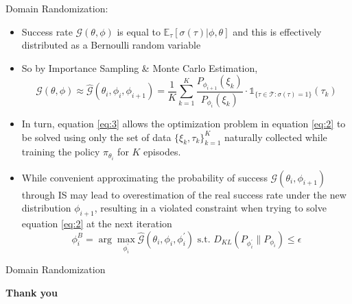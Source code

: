 \documentclass{beamer}
\newcommand{\mbb}[1]{\mathbb{#1}}
\newcommand{\mc}[1]{\mathcal{#1}}
\begin{document}
\begin{frame}{Domain Randomization: \cite{tiboniDomainRandomizationEntropy2024}}
    \begin{itemize}
        \item Success rate $\mc{G}(\theta, \phi)$ is equal to $\mbb{E}_{\tau} [\sigma(\tau) | \phi, \theta]$ and this is effectively distributed as a Bernoulli random variable
        \item So by Importance Sampling \& Monte Carlo Estimation, 
        \begin{equation}\label{eq:3}
        \mc{G}(\theta, \phi) \approx \hat{\mc{G}}(\theta_i, \phi_i, \phi_{i+1}) = \frac{1}{K} \sum_{k=1}^K \frac{P_{\phi_{i+1}}(\xi_k)}{P_{\phi_i}(\xi_k)} \cdot \mbb{1}_{\{\tau \in \mc{T}: \sigma(\tau)=1\}} (\tau_k)
        \end{equation}
        \item In turn, equation \ref{eq:3} allows the optimization problem in equation \ref{eq:2} to be solved using only the set of data $\{\xi_k, \tau_k\}^K_{k=1}$ naturally collected while training the policy $\pi_{\theta_i}$ for $K$ episodes.
        \item While convenient approximating the probability of success $\mc{G}(\theta_i, \phi_{i+1})$ through IS may lead to overestimation of the real success rate under the new distribution $\phi_{i+1}$, resulting in a violated constraint when trying to solve equation \ref{eq:2} at the next iteration
        \begin{equation} \label{eq:4}
            \phi_i^B = \arg \max_{\phi_i^\prime} \hat{\mc{G}}(\theta_i, \phi_i, \phi_i^\prime) \text{ s.t. } D_{KL}(P_{\phi^\prime_i} \parallel P_{\phi_i}) \leq \epsilon
        \end{equation}
    \end{itemize}
\end{frame}

\begin{frame}{Domain Randomization}
    \begin{center}
        \textbf{Thank you}
    \end{center}
\end{frame}
\end{document}
